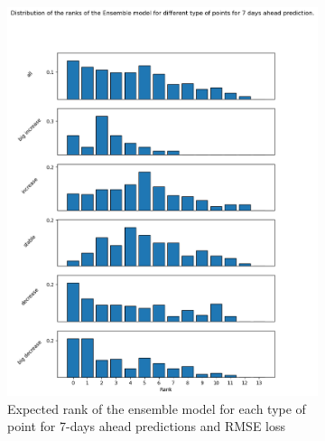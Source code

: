 \begin{figure}[htbp]
    \centering
    \begin{subfigure}[b]{0.45\textwidth}
        \centering
        \includegraphics[width=\textwidth]{figures/esb_rank_7.png}
        \caption{Expected rank of the ensemble model for each type of point for 7-days ahead predictions and RMSE loss}
        \label{fig:esb_rank_7}
    \end{subfigure}
    \hfill
    \begin{subfigure}[b]{0.45\textwidth}
        \centering

\end{subfigure}
\end{figure}
